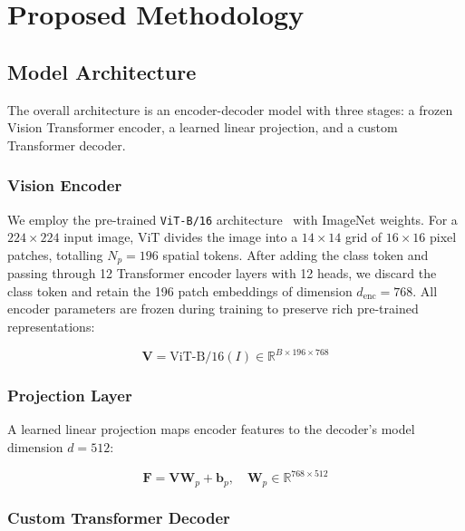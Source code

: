 \documentclass[conference]{IEEEtran}
\begin{document}
\section{Proposed Methodology}
\label{sec:method}

\subsection{Model Architecture}

The overall architecture is an encoder-decoder model with three stages: a frozen Vision Transformer encoder, a learned linear projection, and a custom Transformer decoder.

\subsubsection{Vision Encoder}

We employ the pre-trained \texttt{ViT-B/16} architecture~\cite{b2} with ImageNet weights. For a $224\times224$ input image, ViT divides the image into a $14\times14$ grid of $16\times16$ pixel patches, totalling $N_p = 196$ spatial tokens. After adding the class token and passing through 12 Transformer encoder layers with 12 heads, we discard the class token and retain the 196 patch embeddings of dimension $d_{\text{enc}} = 768$. All encoder parameters are frozen during training to preserve rich pre-trained representations:

\begin{equation}
    \mathbf{V} = \text{ViT-B/16}(I) \in \mathbb{R}^{B \times 196 \times 768}
    \label{eq:vit}
\end{equation}

\subsubsection{Projection Layer}

A learned linear projection maps encoder features to the decoder's model dimension $d = 512$:

\begin{equation}
    \mathbf{F} = \mathbf{V} \mathbf{W}_p + \mathbf{b}_p, \quad \mathbf{W}_p \in \mathbb{R}^{768 \times 512}
    \label{eq:proj}
\end{equation}

\subsubsection{Custom Transformer Decoder}
\end{document}
